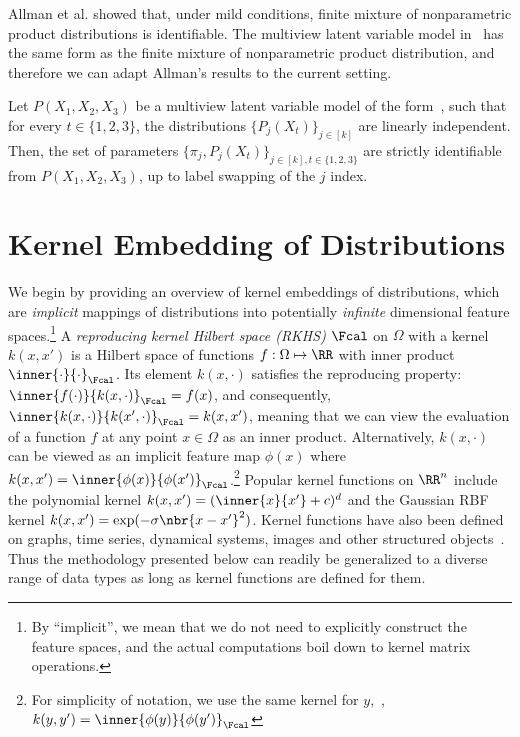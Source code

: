 \documentclass[11pt]{article}
\begin{document}
 Allman et al. showed that, under mild conditions, finite mixture of nonparametric product distributions is identifiable. The multiview latent variable model in~ has the same form as  the finite mixture of nonparametric product distribution, and therefore we can adapt Allman's results to the current setting.
\begin{theorem}
  Let $P(X_1,X_2,X_3)$ be a multiview latent variable model of the form~, such that for every $t \in \{1,2,3\}$, the distributions $\{P_j(X_t)\}_{j \in [k]}$ are linearly independent. Then, the set of parameters $\{\pi_j,P_j(X_t)\}_{j \in [k], t \in \{1, 2, 3\}}$ are strictly identifiable from $P(X_1,X_2,X_3)$, up to label swapping of the $j$ index.
\end{theorem}

\section{Kernel Embedding of Distributions}
\label{sec:embedding}

We begin by providing an overview of kernel embeddings of distributions, which are \emph{implicit} mappings of distributions into potentially \emph{infinite} dimensional feature spaces.\footnote{By ``implicit'', we mean that we do not need to explicitly construct the feature spaces, and the actual computations boil down to kernel matrix operations.} A \emph{reproducing kernel Hilbert space (RKHS)} $\Fcal$ on $\Omega$ with a kernel $k(x,x')$ is a Hilbert space of
functions $f:\Omega \mapsto \RR$ with inner product $\inner{\cdot}{\cdot}_{\Fcal}$. Its element $k(x,\cdot)$ satisfies the reproducing property:
$\inner{f(\cdot)}{k(x, \cdot)}_{\Fcal} = f(x)$, and consequently, $\inner{k(x,\cdot)}{k(x', \cdot)}_{\Fcal} = k(x,x')$,
meaning that we can view the evaluation of a function $f$ at any point $x\in\Omega$ as an inner product. Alternatively, $k(x,\cdot)$ can  be viewed as an implicit feature map $\phi(x)$ where $k(x,x')=\inner{\phi(x)}{\phi(x')}_{\Fcal}$.\footnote{For simplicity of notation, we use the same kernel for $y$,~\ie,~$k(y,y')=\inner{\phi(y)}{\phi(y')}_{\Fcal}$}
Popular kernel functions on $\RR^n$ include the polynomial kernel $k(x,x') =
(\inner{x}{x'}+c)^d$ and the Gaussian RBF kernel $k(x,x') = \exp(-\sigma
  \nbr{x-x'}^2)$. Kernel functions have also been defined on
graphs, time series, dynamical systems, images and other structured
objects~\citep{SchTsuVer04}. Thus the methodology presented below can  readily be generalized to a diverse range of data types as long as kernel functions are defined for them.
\end{document}
